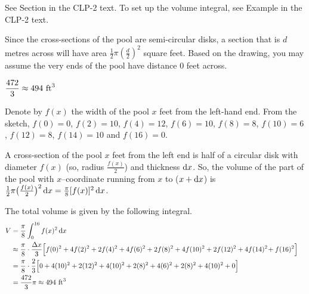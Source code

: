 \begin{hint}
See Section  in the
CLP-2 text.
To set up the volume integral, see Example  in the
CLP-2 text.

Since the cross-sections of the pool are semi-circular disks, a section that is $d$ metres across will have area $\frac{1}{2}\pi\left(\frac{d}{2}\right)^2$ square feet.  Based on the drawing, you may assume the very ends of the pool have distance 0 feet across.
\end{hint}

\begin{answer}
$\dfrac{472}{3}\approx 494 \ {\rm ft}^3$
\end{answer}

\begin{solution}
 Denote by $f(x)$ the width of the pool  $x$ feet
from the left-hand end. From the sketch, $f(0)=0$, $f(2)=10$, $f(4)=12$, $f(6)=10$,
$f(8)=8$, $f(10)=6$, $f(12)=8$, $f(14)=10$ and $f(16)=0$.

A cross-section of the pool $x$ feet from the left end is half of a circular disk with diameter $f(x)$ (so, radius $\frac{f(x)}{2}$) and thickness $\mathrm{d}x$. So, the volume of
the part of the pool with $x$--coordinate running from $x$ to ($x+\mathrm{d}x$) is
$\tfrac{1}{2}\pi\big(\frac{f(x)}{2}\big)^2\,\mathrm{d}x = \frac{\pi}{8}[f(x)]^2\,\mathrm{d}x$.


The total volume is given by the following integral.
\begin{align*}
V&=\frac{\pi}{8}\int_0^{16}f(x)^2\,\mathrm{d}x\cr
&\approx\frac{\pi}{8}\cdot\frac{\Delta x}{3}
\Big[f(0)^2+4f(2)^2+2f(4)^2+4f(6)^2+2f(8)^2
+4f(10)^2+2f(12)^2+4f(14)^2\!+f(16)^2\Big]\cr
&=\frac{\pi}{8}\cdot\frac{2}{3}
\Big[0+4(10)^2+2(12)^2+4(10)^2+2(8)^2
+4(6)^2+2(8)^2+4(10)^2+0\Big]\cr
&=\frac{472}{3}\pi\approx 494 \ {\rm ft}^3
\end{align*}

\end{solution}


